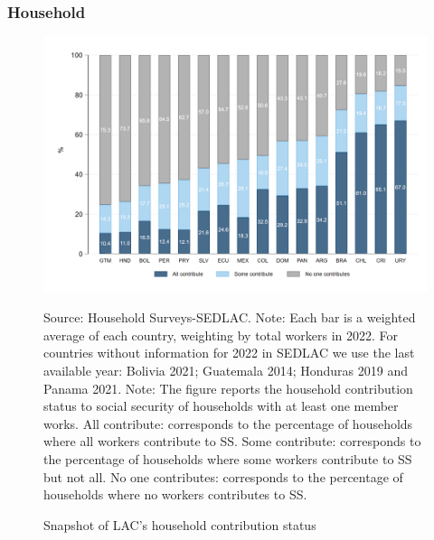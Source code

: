 \documentclass[english]{article}
\begin{document}
\subsubsection{Household}
\begin{figure}[H]
    \justifying
     \caption{Snapshot of LAC’s household contribution status}     \centerline{\includegraphics[scale=.3]{latex/figures/Household/snapshot_household.png}
    \label{fig:Householdlastyear}}
    \footnotesize{Source: Household Surveys-SEDLAC.}
    \footnotesize{Note: Each bar is a weighted average of each country, weighting by total workers in 2022. For countries without information for 2022 in SEDLAC we use the last available year: Bolivia 2021; Guatemala 2014; Honduras 2019 and Panama 2021.}
    \footnotesize{Note: The figure reports the household contribution status to social security of households with at least one member works. All contribute: corresponds to the percentage of households where all workers contribute to SS. Some contribute: corresponds to the percentage of households where some workers contribute to SS but not all. No one contributes: corresponds to the percentage of households where no workers contributes to SS.}
\end{figure}
\end{document}
